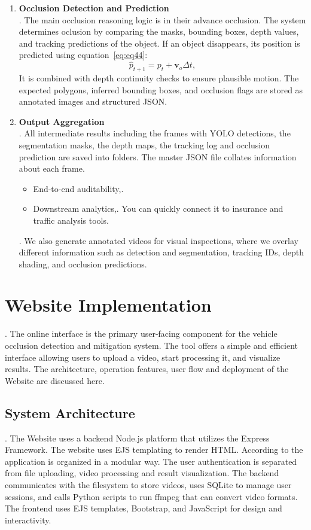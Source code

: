 \documentclass[12pt,a4paper]{report}
\theoremstyle{definition}
\theoremstyle{remark}
\begin{document}
\begin{enumerate}
\item \textbf{Occlusion Detection and Prediction}\\.
The main occlusion reasoning logic is in their advance occlusion. The system determines oclusion by comparing the masks, bounding boxes, depth values, and tracking predictions of the object.
If an object disappears, its position is predicted using equation~\ref{eq:eq44}:
    \begin{equation}
    \label{eq:eq44}
    \hat{p}_{t+1} = p_t + \mathbf{v}_o \Delta t,
    \end{equation}
   It is combined with depth continuity checks to ensure plausible motion. The expected polygons, inferred bounding boxes, and occlusion flags are stored as annotated images and structured JSON.



\item \textbf{Output Aggregation}\\.
All intermediate results including the frames with YOLO detections, the segmentation masks, the depth maps, the tracking log and occlusion prediction are saved into folders.
The master JSON file collates information about each frame.
\begin{itemize}
\item End-to-end auditability,.
\item Downstream analytics,.
You can quickly connect it to insurance and traffic analysis tools.
\end{itemize}.
We also generate annotated videos for visual inspections, where we overlay different information such as detection and segmentation, tracking IDs, depth shading, and occlusion predictions.
\end{enumerate}

\section{Website Implementation}.
The online interface is the primary user-facing component for the vehicle occlusion detection and mitigation system. The tool offers a simple and efficient interface allowing users to upload a video, start processing it, and visualize results. The architecture, operation features, user flow and deployment of the Website are discussed here.

\subsection{System Architecture}.
The Website uses a backend Node.js platform that utilizes the Express Framework. The website uses EJS templating to render HTML. According to the application is organized in a modular way. The user authentication is separated from file uploading, video processing and result visualization. The backend communicates with the filesystem to store videos, uses SQLite to manage user sessions, and calls Python scripts to run ffmpeg that can convert video formats. The frontend uses EJS templates, Bootstrap, and JavaScript for design and interactivity.
\end{document}
